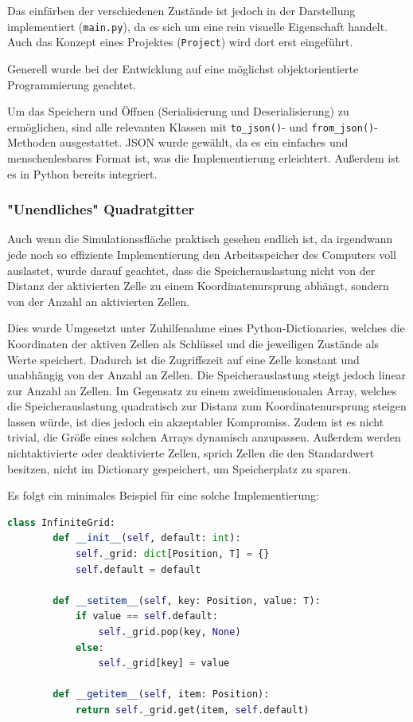 Das einfärben der verschiedenen Zustände ist jedoch in der Darstellung implementiert (\texttt{main.py}), da es sich um eine rein visuelle Eigenschaft handelt. Auch das Konzept eines Projektes (\texttt{Project}) wird dort erst eingeführt.

Generell wurde bei der Entwicklung auf eine möglichst objektorientierte Programmierung geachtet.

Um das Speichern und Öffnen (Serialisierung und Deserialisierung) zu ermöglichen, sind alle relevanten Klassen mit \texttt{to\_json()}- und \texttt{from\_json()}-Methoden ausgestattet. JSON wurde gewählt, da es ein einfaches und menschenlesbares Format ist, was die Implementierung erleichtert. Außerdem ist es in Python bereits integriert.

\subsubsection{"Unendliches" Quadratgitter}
Auch wenn die Simulationssfläche praktisch gesehen endlich ist, da irgendwann jede noch so effiziente Implementierung den Arbeitsspeicher des Computers voll auslastet, wurde darauf geachtet, dass die Speicherauslastung nicht von der Distanz der aktivierten Zelle zu einem Koordinatenursprung abhängt, sondern von der Anzahl an aktivierten Zellen.

Dies wurde Umgesetzt unter Zuhilfenahme eines Python-Dictionaries, welches die Koordinaten der aktiven Zellen als Schlüssel und die jeweiligen Zustände als Werte speichert. Dadurch ist die Zugriffszeit auf eine Zelle konstant und unabhängig von der Anzahl an Zellen. Die Speicherauslastung steigt jedoch linear zur Anzahl an Zellen. Im Gegensatz zu einem zweidimensionalen Array, welches die Speicherauslastung quadratisch zur Distanz zum Koordinatenursprung steigen lassen würde, ist dies jedoch ein akzeptabler Kompromiss. Zudem ist es nicht trivial, die Größe eines solchen Arrays dynamisch anzupassen. Außerdem werden nichtaktivierte oder deaktivierte Zellen, sprich Zellen die den Standardwert besitzen, nicht im Dictionary gespeichert, um Speicherplatz zu sparen.

Es folgt ein minimales Beispiel für eine solche Implementierung:

\begin{lstlisting}[language=Python]
    class InfiniteGrid:
        def __init__(self, default: int):
            self._grid: dict[Position, T] = {}
            self.default = default

        def __setitem__(self, key: Position, value: T):
            if value == self.default:
                self._grid.pop(key, None)
            else:
                self._grid[key] = value

        def __getitem__(self, item: Position):
            return self._grid.get(item, self.default)

\end{lstlisting}

